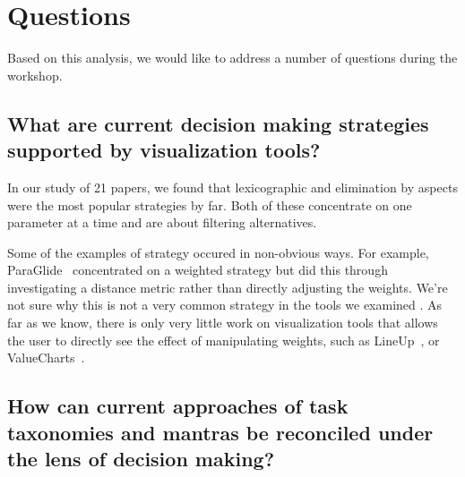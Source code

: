 
\section{Questions}\label{questions}

Based on this analysis, we would like to address a number of questions during the workshop.

\subsection{What are current decision making strategies supported by visualization tools?}

In our study of 21 papers, we found that lexicographic and elimination by aspects were the most popular strategies
by far. Both of these concentrate on one parameter at a time and are
about filtering alternatives.

Some of the examples of strategy occured in non-obvious ways.  For example,
ParaGlide~\citep{Bergner:2013} concentrated on a
weighted strategy but did this through
investigating a distance metric rather than directly adjusting the
weights. We're not sure why this is not a very common strategy in the
tools we examined . As far as we know, there is only 
very little work on visualization tools that allows the user to directly see the
effect of manipulating weights, such as LineUp~\citep{Gratzl:2013}, or 
ValueCharts~\citep{Carenini:2004}.




\subsection{How can current approaches of task taxonomies and mantras be reconciled under the lens of decision making?}

